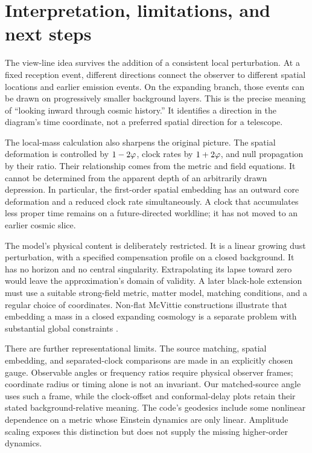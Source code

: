 \section{Interpretation, limitations, and next steps}
The view-line idea survives the addition of a consistent local perturbation.
At a fixed reception event, different directions connect the observer to
different spatial locations and earlier emission events. On the expanding
branch, those events can be drawn on progressively smaller background
layers. This is the precise meaning of ``looking inward through cosmic
history.'' It identifies a direction in the diagram's time coordinate,
not a preferred spatial direction for a telescope.

The local-mass calculation also sharpens the original picture. The
spatial deformation is controlled by $1-2\varphi$, clock rates by $1+2\varphi$,
and null propagation by their ratio. Their relationship comes from the
metric and field equations. It cannot be determined from the apparent
depth of an arbitrarily drawn depression. In particular, the first-order
spatial embedding has an outward core deformation and a reduced clock
rate simultaneously. A clock that accumulates less proper time remains
on a future-directed worldline; it has not moved to an earlier cosmic
slice.

The model's physical content is deliberately restricted. It is a linear
growing dust perturbation, with a specified compensation profile on a
closed background. It has no horizon and no central singularity.
Extrapolating its lapse toward zero would leave the approximation's
domain of validity. A later black-hole extension must use a suitable
strong-field metric, matter model, matching conditions, and a regular
choice of coordinates. Non-flat McVittie constructions illustrate that
embedding a mass in a closed expanding cosmology is a separate problem
with substantial global constraints \citep{Nolan2017}.

There are further representational limits. The source matching, spatial
embedding, and separated-clock comparisons are made in an explicitly
chosen gauge. Observable angles or frequency ratios require physical
observer frames; coordinate radius or timing alone is not an invariant.
Our matched-source angle uses such a frame, while the clock-offset and
conformal-delay plots retain their stated background-relative meaning.
The code's geodesics include some nonlinear dependence on a metric whose
Einstein dynamics are only linear. Amplitude scaling exposes this
distinction but does not supply the missing higher-order dynamics.

